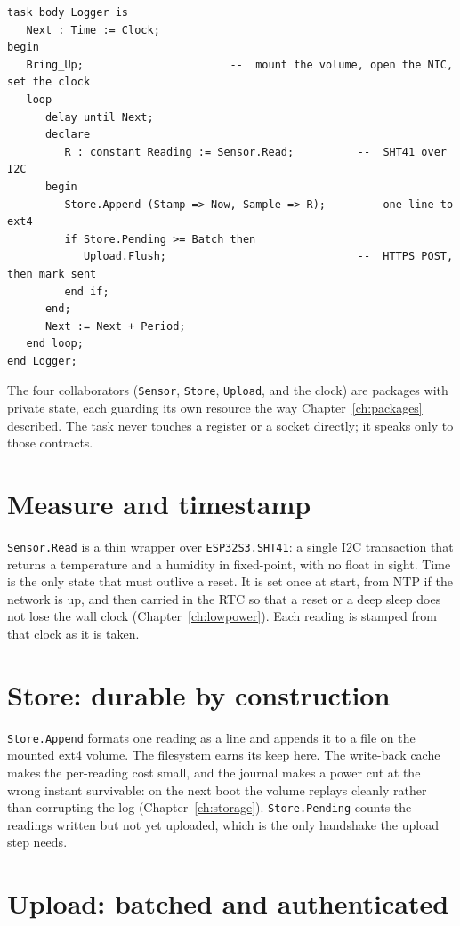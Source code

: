\begin{lstlisting}
task body Logger is
   Next : Time := Clock;
begin
   Bring_Up;                       --  mount the volume, open the NIC, set the clock
   loop
      delay until Next;
      declare
         R : constant Reading := Sensor.Read;          --  SHT41 over I2C
      begin
         Store.Append (Stamp => Now, Sample => R);     --  one line to ext4
         if Store.Pending >= Batch then
            Upload.Flush;                              --  HTTPS POST, then mark sent
         end if;
      end;
      Next := Next + Period;
   end loop;
end Logger;
\end{lstlisting}

The four collaborators (\texttt{Sensor}, \texttt{Store}, \texttt{Upload}, and the
clock) are packages with private state, each guarding its own resource the way
Chapter~\ref{ch:packages} described. The task never touches a register or a socket
directly; it speaks only to those contracts.

\section{Measure and timestamp}

\texttt{Sensor.Read} is a thin wrapper over \texttt{ESP32S3.SHT41}: a single I2C
transaction that returns a temperature and a humidity in fixed-point, with no float
in sight. Time is the only state that must outlive a reset. It is set once at start,
from NTP if the network is up, and then carried in the RTC so that a reset or a deep
sleep does not lose the wall clock (Chapter~\ref{ch:lowpower}). Each reading is
stamped from that clock as it is taken.

\section{Store: durable by construction}

\texttt{Store.Append} formats one reading as a line and appends it to a file on the
mounted ext4 volume. The filesystem earns its keep here. The write-back cache makes
the per-reading cost small, and the journal makes a power cut at the wrong instant
survivable: on the next boot the volume replays cleanly rather than corrupting the
log (Chapter~\ref{ch:storage}). \texttt{Store.Pending} counts the readings written
but not yet uploaded, which is the only handshake the upload step needs.

\section{Upload: batched and authenticated}

